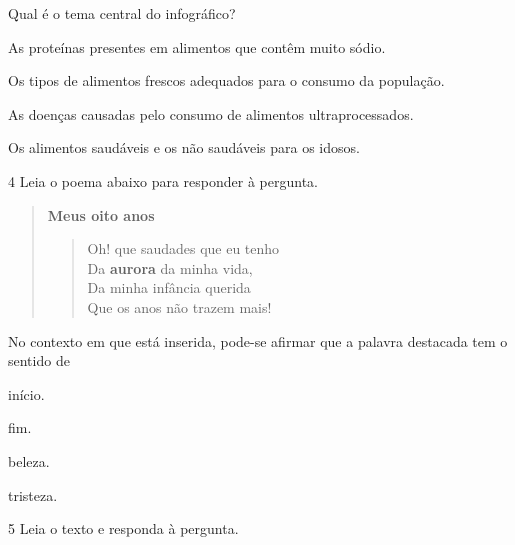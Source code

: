 
Qual é o tema central do infográfico?

\begin{escolha}
\item As proteínas presentes em alimentos que contêm muito sódio.

\item Os tipos de alimentos frescos adequados para o consumo da população.

\item As doenças causadas pelo consumo de alimentos ultraprocessados.

\item Os alimentos saudáveis e os não saudáveis para os idosos.
\end{escolha}

\num{4} Leia o poema abaixo para responder à pergunta.

\begin{quote}
\textbf{Meus oito anos}

\begin{verse}
Oh! que saudades que eu tenho\\
Da \textbf{aurora} da minha vida,\\
Da minha infância querida\\
Que os anos não trazem mais! 
\end{verse}


\end{quote}

No contexto em que está inserida, pode-se afirmar que a palavra destacada
tem o sentido de

\begin{multicols}{2}
\begin{escolha}
  \item início.
  \item fim.
  \item beleza.
  \item tristeza.
\end{escolha} 
\end{multicols}

\pagebreak
\num{5} Leia o texto e responda à pergunta.


